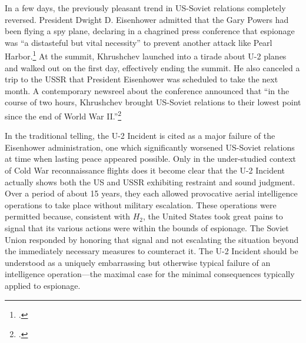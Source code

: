 \documentclass[12pt]{extarticle}
\begin{document}
In a few days, the previously pleasant trend in US-Soviet relations completely reversed. President Dwight D. Eisenhower admitted that the Gary Powers had been flying a spy plane, declaring in a chagrined press conference that espionage was ``a distasteful but vital necessity'' to prevent another attack like Pearl Harbor.\footcite{eisenhower_news_1960} At the summit, Khrushchev launched into a tirade about U-2 planes and walked out on the first day, effectively ending the summit. He also canceled a trip to the USSR that President Eisenhower was scheduled to take the next month. A contemporary newsreel about the conference announced that \enquote{in the course of two hours, Khrushchev brought US-Soviet relations to their lowest point since the end of World War II.}\footcite{universal_studios_summit_1960}

In the traditional telling, the U-2 Incident is cited as a major failure of the Eisenhower administration, one which significantly worsened US-Soviet relations at time when lasting peace appeared possible. Only in the under-studied context of Cold War reconnaissance flights does it become clear that the U-2 Incident actually shows both the US and USSR exhibiting restraint and sound judgment. Over a period of about 15 years, they each allowed provocative aerial intelligence operations to take place without military escalation. These operations were permitted because, consistent with $H_2$, the United States took great pains to signal that its various actions were within the bounds of espionage. The Soviet Union responded by honoring that signal and not escalating the situation beyond the immediately necessary measures to counteract it. The U-2 Incident should be understood as a uniquely embarrassing but otherwise typical failure of an intelligence operation---the maximal case for the minimal consequences typically applied to espionage.

\end{document}
